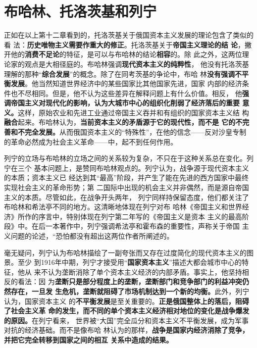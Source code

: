 \section{布哈林、托洛茨基和列宁}

正如在以上第十二章看到的，托洛茨基关于俄国资本主义发展的理论包含了类似的看
法：\textbf{历史唯物主义需要作重大的修正}。托洛茨基关于\textbf{帝国主义理论的结
  论}，撇开他的\textbf{消费不足论}的特征，是可以与布哈林的结论\textbf{相容}的。除
此之外，这两位理论家的观点是大相径庭的。布哈林强调\textbf{现代资本主义的纯粹性}，
他没有托洛茨基理解的那种“\textbf{综合发展}”的概念。除了在同考茨基的争论中，布哈
林\textbf{没有强调不平衡发展}。他当然知道世界经济中的某些国家比其他国家先进，国家
内部的经济条件也不尽相同。但是，他不认为这些差异在解释问题上有什么价值。相反，
他\textbf{强调帝国主义对现代化的影响，认为大城市中心的组织化削弱了经济落后的重要
  意义。}这样，原始农业和先进工业通过帝国主义吞并和有组织的国家资本主义结
构\textbf{融合}起来。布哈林认为，\textbf{当前资本主义的矛盾源于它的现代性，而不是
  它的不完善和不完全发展。}从而俄国资本主义的“特殊性”，在他的信念——反对沙皇专制
的革命必然成为社会主义革命——中，起不到任何作用。

列宁的立场与布哈林的立场之间的关系较为复杂，不只在于这种关系总在变化。列宁在三个
基本问题上，是赞同布哈林观点的。列宁认为，战争源于现代资本主义的本质；资本主义已
经达到其“最高”阶段，并产生了能在先进的西方国家中最终实现社会主义的革命形势；第
二国际中出现的机会主义并非偶然，而是源自帝国主义的本质。尽管如此，在战争开头两年，
列宁同样持保留态度，他们都关注了布哈林和希法亭不同的地方。这清晰地体现在列宁对布
哈林《帝国主义和世界经济》所作的序言中，特别体现在列宁第二年写的《帝国主义是资本
主义的最高阶段》中。在后一本著作中，列宁强调希法亭和霍布森的重要性，声称关于帝国
主义问题的论述，“恐怕都没有超出这两位作者所阐述的。

毫无疑问，列宁认为布哈林描绘了一副夸张而又存在过度简化的现代资本主义的图景。至少
到1916年中期，列宁才接受用“\textbf{国家资本主义}”描述大都会城市中心的特征，他从
来不认为垄断消除了单个资本主义经济的内部矛盾。事实上，他坚持相反的看法：因
为\textbf{垄断只是部分程度上的垄断，垄断部门和竞争部门的利益冲突仍然存在，一旦发
  生危机，垄断就阻碍了市场机制达到一个新的均衡。}此外，列宁认为，国家资本主义
的\textbf{不平衡发展}是至关重要的。\textbf{正是俄国整体上的落后，阻碍了社会主义革
  命的发生，而不同的单个资本主义经济相对地位的变化是战争爆发的原因。}在列宁看来，
世界被“大国”完全瓜分和资本主义不平衡发展，成为军事对抗的经济基础。而不是像布哈
林认为的那样，\textbf{战争是国家内经济消除了竞争，并把它完全转移到国家之间的相互
  关系中造成的结果。}

